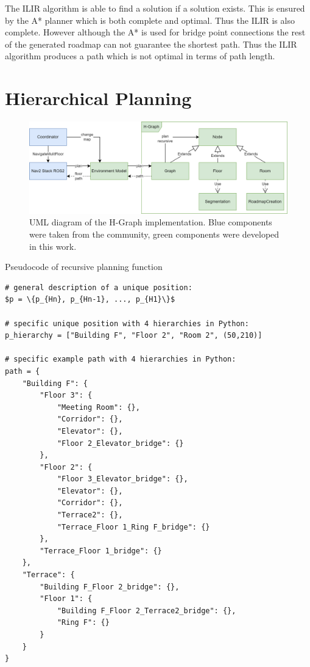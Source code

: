 The ILIR algorithm is able to find a solution if a solution exists. This is ensured by the A* planner which is both complete and optimal. Thus the ILIR is also complete. However although the A* is used for bridge point connections the rest of the generated roadmap can not guarantee the shortest path. Thus the ILIR algorithm produces a path which is not optimal in terms of path length.


\section{Hierarchical Planning}
\label{sec:impl_hierarchical_planning}

\begin{figure}[h]
    \centering
    \includegraphics[width=\textwidth]{figures/50_implementation/h_graph_uml.png}
    \caption[UML diagram of the H-Graph implementation]{UML diagram of the H-Graph implementation. Blue components were taken from the community, green components were developed in this work.}
    \label{fig:h_graph_uml}
\end{figure}

Pseudocode of recursive planning function


\begin{lstlisting}[float=h]
# general description of a unique position:
$p = \{p_{Hn}, p_{Hn-1}, ..., p_{H1}\}$

# specific unique position with 4 hierarchies in Python:
p_hierarchy = ["Building F", "Floor 2", "Room 2", (50,210)]

# specific example path with 4 hierarchies in Python:
path = {
    "Building F": {
        "Floor 3": {
            "Meeting Room": {},
            "Corridor": {},
            "Elevator": {},
            "Floor 2_Elevator_bridge": {}
        },
        "Floor 2": {
            "Floor 3_Elevator_bridge": {},
            "Elevator": {},
            "Corridor": {},
            "Terrace2": {},
            "Terrace_Floor 1_Ring F_bridge": {}
        },
        "Terrace_Floor 1_bridge": {}
    },
    "Terrace": {
        "Building F_Floor 2_bridge": {},
        "Floor 1": {
            "Building F_Floor 2_Terrace2_bridge": {},
            "Ring F": {}
        }
    }
}
\end{lstlisting}

